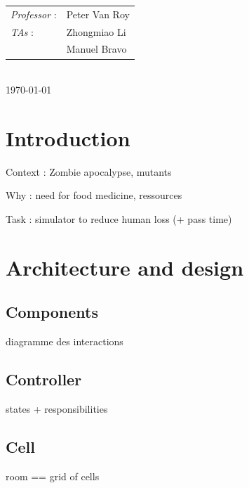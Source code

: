 \documentclass[12pt,a4paper]{article}
\begin{document}
\begin{titlepage}
\normalsize
{\begin{tabular}{ll}
\textit{Professor}  : & Peter Van Roy \\
\textit{TAs} 		: & Zhongmiao Li \\
					  & Manuel Bravo \\
\end{tabular}}
\\[1cm]


{\normalsize \today} %

\newpage

\end{titlepage}




\section*{Introduction}
Context : Zombie apocalypse, mutants

Why : need for food medicine, ressources

Task : simulator to reduce human loss (+ pass time)

\section{Architecture and design}
\subsection{Components}
diagramme des interactions

\subsection{Controller}
states + responsibilities

\subsection{Cell}
room == grid of cells
\end{document}

